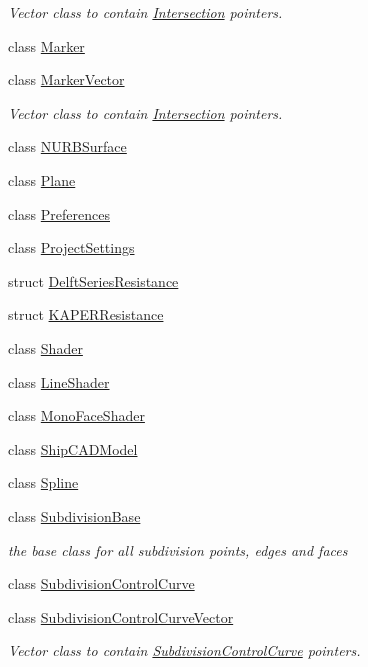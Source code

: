 \begin{DoxyCompactItemize}
\begin{DoxyCompactList}\small\item\em Vector class to contain \hyperlink{classShipCAD_1_1Intersection}{Intersection} pointers. \end{DoxyCompactList}\item 
class \hyperlink{classShipCAD_1_1Marker}{Marker}
\item 
class \hyperlink{classShipCAD_1_1MarkerVector}{Marker\-Vector}
\begin{DoxyCompactList}\small\item\em Vector class to contain \hyperlink{classShipCAD_1_1Intersection}{Intersection} pointers. \end{DoxyCompactList}\item 
class \hyperlink{classShipCAD_1_1NURBSurface}{N\-U\-R\-B\-Surface}
\item 
class \hyperlink{classShipCAD_1_1Plane}{Plane}
\item 
class \hyperlink{classShipCAD_1_1Preferences}{Preferences}
\item 
class \hyperlink{classShipCAD_1_1ProjectSettings}{Project\-Settings}
\item 
struct \hyperlink{structShipCAD_1_1DelftSeriesResistance}{Delft\-Series\-Resistance}
\item 
struct \hyperlink{structShipCAD_1_1KAPERResistance}{K\-A\-P\-E\-R\-Resistance}
\item 
class \hyperlink{classShipCAD_1_1Shader}{Shader}
\item 
class \hyperlink{classShipCAD_1_1LineShader}{Line\-Shader}
\item 
class \hyperlink{classShipCAD_1_1MonoFaceShader}{Mono\-Face\-Shader}
\item 
class \hyperlink{classShipCAD_1_1ShipCADModel}{Ship\-C\-A\-D\-Model}
\item 
class \hyperlink{classShipCAD_1_1Spline}{Spline}
\item 
class \hyperlink{classShipCAD_1_1SubdivisionBase}{Subdivision\-Base}
\begin{DoxyCompactList}\small\item\em the base class for all subdivision points, edges and faces \end{DoxyCompactList}\item 
class \hyperlink{classShipCAD_1_1SubdivisionControlCurve}{Subdivision\-Control\-Curve}
\item 
class \hyperlink{classShipCAD_1_1SubdivisionControlCurveVector}{Subdivision\-Control\-Curve\-Vector}
\begin{DoxyCompactList}\small\item\em Vector class to contain \hyperlink{classShipCAD_1_1SubdivisionControlCurve}{Subdivision\-Control\-Curve} pointers. \end{DoxyCompactList}\item 

\end{DoxyCompactItemize}
